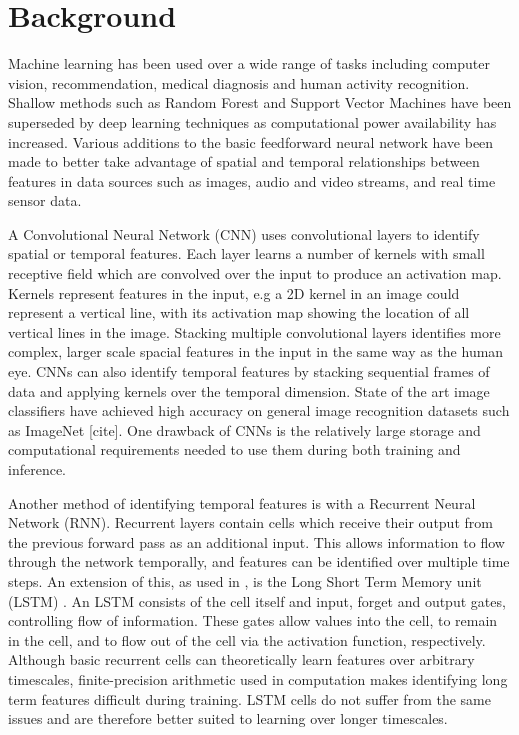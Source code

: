 \chapter{Background}

Machine learning has been used over a wide range of tasks including computer vision, recommendation, medical diagnosis and human activity recognition. Shallow methods such as Random Forest and Support Vector Machines have been superseded by deep learning techniques as computational power availability has increased. Various additions to the basic feedforward neural network have been made to better take advantage of spatial and temporal relationships between features in data sources such as images, audio and video streams, and real time sensor data.

A Convolutional Neural Network (CNN) \cite{Neocognitron} uses convolutional layers to identify spatial or temporal features. Each layer learns a number of kernels with small receptive field which are convolved over the input to produce an activation map. Kernels represent features in the input, e.g a 2D kernel in an image could represent a vertical line, with its activation map showing the location of all vertical lines in the image. Stacking multiple convolutional layers identifies more complex, larger scale spacial features in the input in the same way as the human eye. CNNs can also identify temporal features by stacking sequential frames of data and applying kernels over the temporal dimension.
State of the art image classifiers have achieved high accuracy on general image recognition datasets such as ImageNet [cite]. One drawback of CNNs is the relatively large storage and computational requirements needed to use them during both training and inference.

Another method of identifying temporal features is with a Recurrent Neural Network (RNN). Recurrent layers contain cells which receive their output from the previous forward pass as an additional input. This allows information to flow through the network temporally, and features can be identified over multiple time steps.
An extension of this, as used in \cite{DeepConvLSTM}, is the Long Short Term Memory unit (LSTM) \cite{LSTM}. 
An LSTM consists of the cell itself and input, forget and output gates, controlling flow of information. These gates allow values into the cell, to remain in the cell, and to flow out of the cell via the activation function, respectively. Although basic recurrent cells can theoretically learn features over arbitrary timescales, finite-precision arithmetic used in computation makes identifying long term features difficult during training. LSTM cells do not suffer from the same issues and are therefore better suited to learning over longer timescales.

